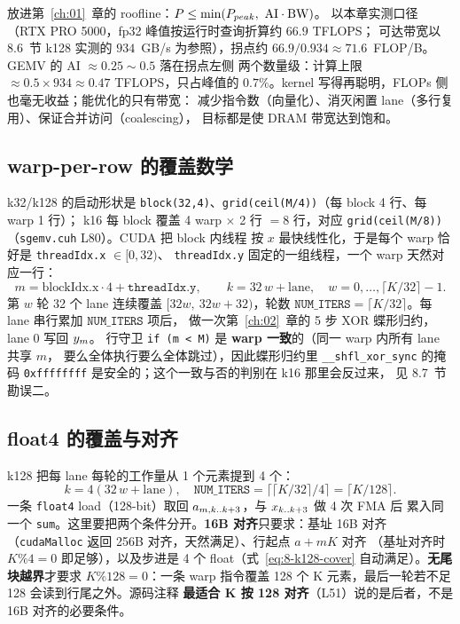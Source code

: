 放进第~\ref{ch:01}~章的 roofline：$P \le \min(P\sb{peak},\ \mathrm{AI} \cdot \mathrm{BW})$。
以本章实测口径（RTX PRO 5000，fp32 峰值按运行时查询折算约 $66.9$ TFLOPS；
可达带宽以 8.6~节 k128 实测的 $934$~GB/s 为参照），拐点约
$66.9 / 0.934 \approx 71.6$~FLOP/B。GEMV 的 AI $\approx 0.25 \sim 0.5$ 落在拐点左侧
两个数量级：计算上限 $\approx 0.5 \times 934 \approx 0.47$ TFLOPS，只占峰值的
$0.7\%$。kernel 写得再聪明，FLOPs 侧也毫无收益；能优化的只有带宽：
减少指令数（向量化）、消灭闲置 lane（多行复用）、保证合并访问（coalescing），
目标都是使 DRAM 带宽达到饱和。

\subsection{warp-per-row 的覆盖数学}

k32/k128 的启动形状是 \texttt{block(32,4)}、\texttt{grid(ceil(M/4))}（每 block 4 行、每 warp 1 行）；
k16 每 block 覆盖 4 warp $\times$ 2 行 $=8$ 行，对应 \texttt{grid(ceil(M/8))}（\texttt{sgemv.cuh} L80）。CUDA 把 block 内线程
按 $x$ 最快线性化，于是每个 warp 恰好是 \texttt{threadIdx.x} $\in [0,32)$、
\texttt{threadIdx.y} 固定的一组线程，一个 warp 天然对应一行：
\begin{equation}
  m = \mathrm{blockIdx.x} \cdot 4 + \texttt{threadIdx.y} ,
  \qquad
  k = 32\,w + \mathrm{lane},\quad w = 0, \dots, \lceil K/32 \rceil - 1 .
  \label{eq:8-k32-cover}
\end{equation}
第 $w$ 轮 32 个 lane 连续覆盖 $[32w,\ 32w+32)$，轮数
$\texttt{NUM\_ITERS} = \lceil K/32 \rceil$。每 lane 串行累加 $\texttt{NUM\_ITERS}$ 项后，
做一次第~\ref{ch:02}~章的 5 步 XOR 蝶形归约，lane 0 写回 $y\sb{m}$。
行守卫 \texttt{if (m < M)} 是 \textbf{warp 一致}的（同一 warp 内所有 lane 共享 $m$，
要么全体执行要么全体跳过），因此蝶形归约里 \texttt{\_\allowbreak{}\_\allowbreak{}shfl\_\allowbreak{}xor\_\allowbreak{}sync} 的掩码
\texttt{0xffffffff} 是安全的；这个一致与否的判别在 k16 那里会反过来，
见 8.7~节勘误二。

\subsection{float4 的覆盖与对齐}

k128 把每 lane 每轮的工作量从 1 个元素提到 4 个：
\begin{equation}
  k = 4(32\,w + \mathrm{lane}), \quad
  \texttt{NUM\_ITERS} = \lceil\lceil K/32 \rceil / 4\rceil = \lceil K/128 \rceil .
  \label{eq:8-k128-cover}
\end{equation}
一条 \texttt{float4} load（128-bit）取回 $a\sb{m,k..k+3}$，与 $x\sb{k..k+3}$ 做 4 次 FMA 后
累入同一个 \texttt{sum}。这里要把两个条件分开。\textbf{16B 对齐}只要求：基址 16B
对齐（\texttt{cudaMalloc} 返回 256B 对齐，天然满足）、行起点 $a + mK$ 对齐
（基址对齐时 $K \% 4 = 0$ 即足够），以及步进是 4 个 float（式~\ref{eq:8-k128-cover}
自动满足）。\textbf{无尾块越界}才要求 $K \% 128 = 0$：一条 warp 指令覆盖 128 个
K 元素，最后一轮若不足 128 会读到行尾之外。源码注释
\textbf{最适合 K 按 128 对齐}（L51）说的是后者，不是 16B 对齐的必要条件。

